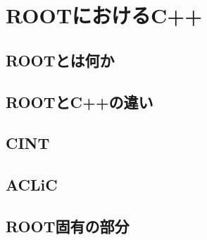 \chapter{ROOTにおけるC++}
\label{chap:C++inROOT}

\section{ROOTとは何か}

\section{ROOTとC++の違い}
\section{CINT}

\section{ACLiC}

\section{ROOT固有の部分}
